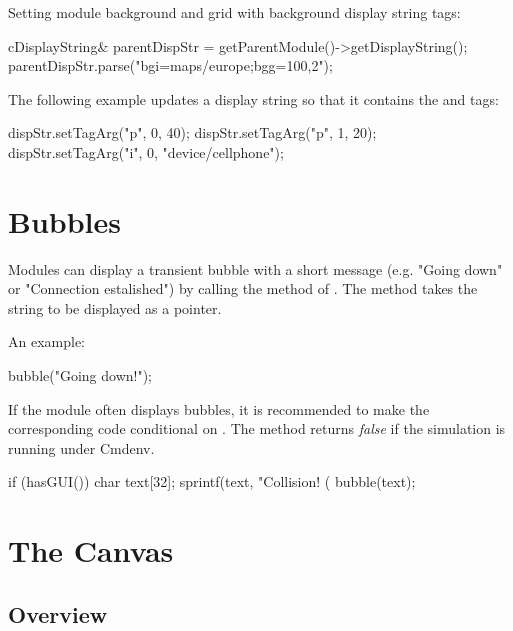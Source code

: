 Setting module background and grid with background display string tags:

\begin{cpp}
cDisplayString& parentDispStr = getParentModule()->getDisplayString();
parentDispStr.parse("bgi=maps/europe;bgg=100,2");
\end{cpp}

The following example updates a display string so that it contains
the  and  tags:

\begin{cpp}
dispStr.setTagArg("p", 0, 40);
dispStr.setTagArg("p", 1, 20);
dispStr.setTagArg("i", 0, "device/cellphone");
\end{cpp}

\section{Bubbles}
\label{sec:graphics:bubbles}

Modules can display a transient bubble with a short message (e.g. "Going
down" or "Connection estalished") by calling the  method of
. The method takes the string to be displayed as a
 pointer.

An example:
\begin{cpp}
bubble("Going down!");
\end{cpp}

\begin{center}
\end{center}

If the module often displays bubbles, it is recommended to make the
corresponding code conditional on . The 
method returns \textit{false} if the simulation is running under Cmdenv.

\begin{cpp}
if (hasGUI()) {
    char text[32];
    sprintf(text, "Collision! (%
    bubble(text);
}
\end{cpp}



\section{The Canvas}
\label{sec:graphics:canvas}

\subsection{Overview}
\label{sec:graphics:canvas-overview}

